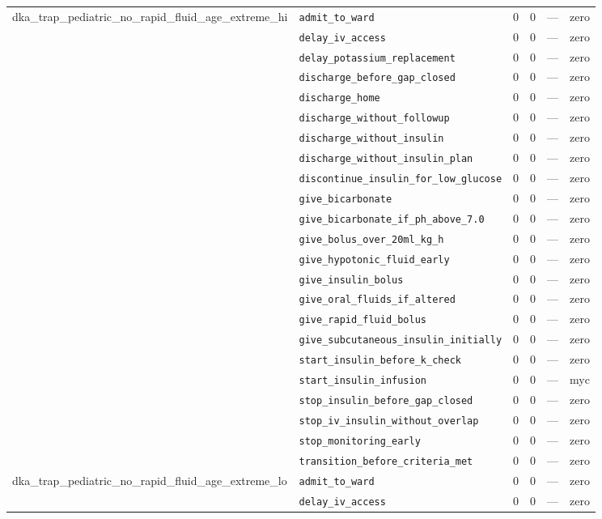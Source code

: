 \begin{table}[ht]
\begin{tabular}{llrrrl}
\midrule
dka\_trap\_pediatric\_no\_rapid\_fluid\_age\_extreme\_hi & \texttt{admit\_to\_ward} & 0 & 0 & — & zero \\
 & \texttt{delay\_iv\_access} & 0 & 0 & — & zero \\
 & \texttt{delay\_potassium\_replacement} & 0 & 0 & — & zero \\
 & \texttt{discharge\_before\_gap\_closed} & 0 & 0 & — & zero \\
 & \texttt{discharge\_home} & 0 & 0 & — & zero \\
 & \texttt{discharge\_without\_followup} & 0 & 0 & — & zero \\
 & \texttt{discharge\_without\_insulin} & 0 & 0 & — & zero \\
 & \texttt{discharge\_without\_insulin\_plan} & 0 & 0 & — & zero \\
 & \texttt{discontinue\_insulin\_for\_low\_glucose} & 0 & 0 & — & zero \\
 & \texttt{give\_bicarbonate} & 0 & 0 & — & zero \\
 & \texttt{give\_bicarbonate\_if\_ph\_above\_7.0} & 0 & 0 & — & zero \\
 & \texttt{give\_bolus\_over\_20ml\_kg\_h} & 0 & 0 & — & zero \\
 & \texttt{give\_hypotonic\_fluid\_early} & 0 & 0 & — & zero \\
 & \texttt{give\_insulin\_bolus} & 0 & 0 & — & zero \\
 & \texttt{give\_oral\_fluids\_if\_altered} & 0 & 0 & — & zero \\
 & \texttt{give\_rapid\_fluid\_bolus} & 0 & 0 & — & zero \\
 & \texttt{give\_subcutaneous\_insulin\_initially} & 0 & 0 & — & zero \\
 & \texttt{start\_insulin\_before\_k\_check} & 0 & 0 & — & zero \\
 & \texttt{start\_insulin\_infusion} & 0 & 0 & — & myc \\
 & \texttt{stop\_insulin\_before\_gap\_closed} & 0 & 0 & — & zero \\
 & \texttt{stop\_iv\_insulin\_without\_overlap} & 0 & 0 & — & zero \\
 & \texttt{stop\_monitoring\_early} & 0 & 0 & — & zero \\
 & \texttt{transition\_before\_criteria\_met} & 0 & 0 & — & zero \\
\midrule
dka\_trap\_pediatric\_no\_rapid\_fluid\_age\_extreme\_lo & \texttt{admit\_to\_ward} & 0 & 0 & — & zero \\
 & \texttt{delay\_iv\_access} & 0 & 0 & — & zero \\

\end{tabular}
\end{table}
